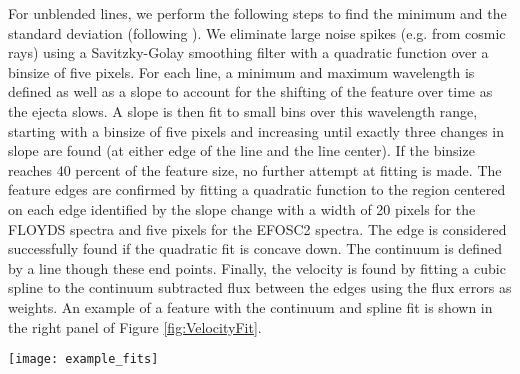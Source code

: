 \documentclass[a4paper,fleqn,usenatbib]{mnras}
\begin{document}
For unblended lines, we perform the following steps to find the minimum and the standard deviation (following \citealt{2012silverman}).
We eliminate large noise spikes (e.g. from cosmic rays) using a Savitzky-Golay smoothing filter \citep{1964savitzky} with a quadratic function over a binsize of five pixels. 
For each line, a minimum and maximum wavelength is defined as well as a slope to account for the shifting of the feature over time as the ejecta slows. 
A slope is then fit to small bins over this wavelength range, starting with a binsize of five pixels and increasing until exactly three changes in slope are found (at either edge of the line and the line center). 
If the binsize reaches 40 percent of the feature size, no further attempt at fitting is made. 
The feature edges are confirmed by fitting a quadratic function to the region centered on each edge identified by the slope change with a width of 20 pixels for the FLOYDS spectra and five pixels for the EFOSC2 spectra. 
The edge is considered successfully found if the quadratic fit is concave down. 
The continuum is defined by a line though these end points.
Finally, the velocity is found by fitting a cubic spline to the continuum subtracted flux between the edges using the flux errors as weights. 
An example of a feature with the continuum and spline fit is shown in the right panel of Figure \ref{fig:VelocityFit}.
\begin{figure*}
\begin{center}
\texttt{[image: example\_fits]}
\caption{An example of a fit to the multi-component Ca II NIR triplet (left) using multiple Gaussians and a single line fit (following \citealt{2012silverman}, right) to the Sc II ($\rm{\lambda}$5662) line.
The observed spectrum is plotted in black.
The continuum edges are marked with a cyan circle and the cyan dashed line connecting these points is used as the continuum. 
The Ca II NIR triplet fit is found by simultaneously fitting 3 Gaussians with the same standard deviation and mean offsets corresponding to the expected wavelength separation of the triplet. 
The individual Gaussians are plotting at as dotted lines and the combined fit is plotted as a solid green line. 
The minima of the individual Gaussians is used to find the velocity of each component.
The Sc II feature is fit with a cubic spliine. 
The minimum of the spline is used to find the Sc II velocity.
\label{fig:VelocityFit}}
\end{center}
\end{figure*}
\end{document}
